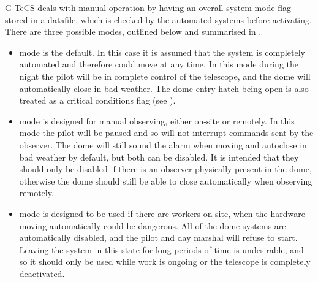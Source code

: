 \begin{colsection}
G-TeCS deals with manual operation by having an overall system mode flag stored in a datafile, which is checked by the automated systems before activating. There are three possible modes, outlined below and summarised in .

\begin{itemize}
    \item {} mode is the default. In this case it is assumed that the system is completely automated and therefore could move at any time. In this mode during the night the pilot will be in complete control of the telescope, and the dome will automatically close in bad weather. The dome entry hatch being open is also treated as a critical conditions flag (see ).

    \item {} mode is designed for manual observing, either on-site or remotely. In this mode the pilot will be paused and so will not interrupt commands sent by the observer. The dome will still sound the alarm when moving and autoclose in bad weather by default, but both can be disabled. It is intended that they should only be disabled if there is an observer physically present in the dome, otherwise the dome should still be able to close automatically when observing remotely.

    \item {} mode is designed to be used if there are workers on site, when the hardware moving automatically could be dangerous. All of the dome systems are automatically disabled, and the pilot and day marshal will refuse to start. Leaving the system in this state for long periods of time is undesirable, and so it should only be used while work is ongoing or the telescope is completely deactivated.
\end{itemize}

\newpage

\end{colsection}


